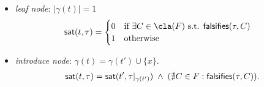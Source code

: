 \begin{frame}

  \noindent

  \begin{itemize}
   \item \emph{leaf node}: $|\gamma(t)|=1$\pause
   \begin{align*}
   \sat(t,\tau) &= \begin{cases} 0 & \text{if $\exists C\in \cla(F)$ s.t. $\falsifies(\tau,C)$}\\1 & \text{otherwise}\end{cases}
   \end{align*}
   \pause
   \item \emph{introduce node}: $\gamma(t) = \gamma(t') \cup \{x\}$.
   \pause
          \begin{align*}
           \mathsf{sat}(t,\tau) = \mathsf{sat}(t', \tau|_{\gamma(t')}) 
           \; \wedge \;  (\nexists C\in F : \mathsf{falsifies}(\tau,C)).
          \end{align*}
  \end{itemize}

\end{frame}

